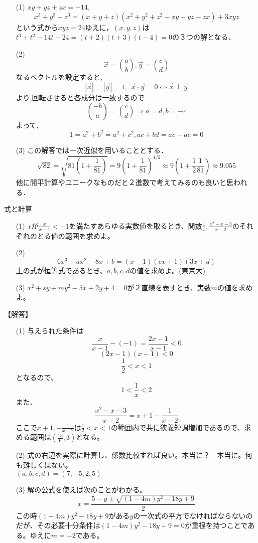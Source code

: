 \documentclass[a4paper,fleqn,dvipdfmx]{jsarticle}
\begin{document}
\begin{itemize}
    \item [(1)] $xy+yz+zx=-14,$$$x^3+y^3+z^3=(x+y+z)(x^2+y^2+z^2-xy-yz-zx)+3xyz$$という式から$xyz=24$ゆえに，$(x,y,z)$は$t^3+t^2-14t-24=(t+2)(t+3)(t-4)=0$の３つの解となる．
    \item [(2)]  $$\overrightarrow{ x }= { a \choose b }  , \overrightarrow{ y }= { c \choose d }  $$
なるベクトルを設定すると,$$ \left| \overrightarrow{ x } \right|=\left| \overrightarrow{ y } \right|=1,\hspace{5pt}   \overrightarrow{ x }\cdot \overrightarrow{ y }=0 \iff  \overrightarrow{ x }  \perp  \overrightarrow{ y } $$
より,回転させると各成分は一致するので
$${ -b \choose a }={ c \choose d } \Rightarrow a=d,b=-c$$
よって,
$$1=a^2+b^2=a^2+c^2,ac+bd=ac-ac=0$$
    \item [(3)] この解答では一次近似を用いることとする．$$\sqrt{82}=\sqrt{81(1+\frac{1}{81})}=9(1+\frac{1}{81})^{1/2}\approx 9(1+\frac{1}{2}\frac{1}{81}) \approx 9.055$$
    他に開平計算やユニークなものだと２進数で考えてみるのも良いと思われる．
\end{itemize}



\newpage
\begin{itembox}[l]{式と計算}
\begin{itemize}
    \item [(1)] $x$が$\frac{x}{x-1}<-1$を満たすあらゆる実数値を取るとき、関数$\frac{1}{x},\frac{x^2-x-3}{x-2}$のそれぞれのとる値の範囲を求めよ。
    \item [(2)] $$6x^3+ax^2-8x+b=(x-1)(cx+1)(3x+d)$$
    上の式が恒等式であるとき、$a,b,c,d$の値を求めよ。(東京大)
    \item [(3)] $x^2+sy+my^2-5x+2y+4=0$が２直線を表すとき、実数$m$の値を求めよ。
\end{itemize}
\end{itembox}

\begin{flushleft}
【解答】
\end{flushleft}

\begin{itemize}
    \item [(1)] 与えられた条件は
    $$\frac{x}{x-1}-(-1)=\frac{2x-1}{x-1}<0$$
    $$(2x-1)(x-1)<0$$
    $$\frac{1}{2}<x<1$$
    となるので、
    $$1<\frac{1}{x}<2$$
    また、
    $$\frac{x^2-x-3}{x-2}=x+1-\frac{1}{x-2}$$
    ここで$x+1,-\frac{1}{x-2}$は$\frac{1}{2}<x<1$の範囲内で共に狭義短調増加であるので、求める範囲は$(\frac{13}{6},3)$となる。
    \item [(2)] 式の右辺を実際に計算し、係数比較すれば良い。本当に？　本当に。何も難しくはない。\\$(a,b,c,d)=(7,-5,2,5)$
    \item [(3)] 解の公式を使えば次のことがわかる。$$x=\frac{5-y\pm \sqrt{(1-4m)y^2-18y+9}}{2}$$
    この時$(1-4m)y^2-18y+9$がある$y$の一次式の平方でなければならないのだが、その必要十分条件は$(1-4m)y^2-18y+9=0$が重根を持つことである。ゆえに$m=-2$である。
    
\end{itemize}
\end{document}
